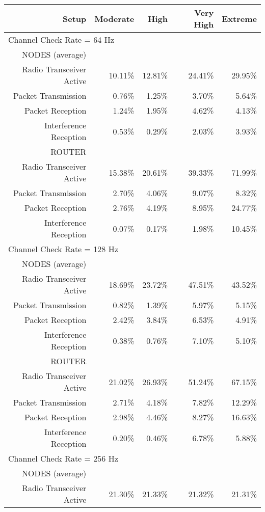 \documentclass[a4paper,twoside]{article}
\begin{document}
\begin{subtables}
\begin{table*}[htbp]
\centering
\begin{tabular}{|r|r|r|r|r|}
\hline
Setup & Moderate & High & Very High & Extreme \\
\hline
\multicolumn{5}{|l|}{Channel Check Rate = 64 Hz}\\
\hline
NODES (average) & & & & \\
Radio Transceiver Active & 10.11\% & 12.81\% & 24.41\% & 29.95\% \\
Packet Transmission & 0.76\% & 1.25\% & 3.70\% & 5.64\% \\
Packet Reception & 1.24\% & 1.95\% & 4.62\% & 4.13\% \\
Interference Reception & 0.53\% & 0.29\% & 2.03\% & 3.93\% \\
ROUTER & & & & \\
Radio Transceiver Active & 15.38\% & 20.61\% & 39.33\% & 71.99\% \\
Packet Transmission & 2.70\% & 4.06\% & 9.07\% & 8.32\% \\
Packet Reception & 2.76\% & 4.19\% & 8.95\% & 24.77\% \\
Interference Reception & 0.07\% & 0.17\% & 1.98\% & 10.45\% \\
\hline
\multicolumn{5}{|l|}{Channel Check Rate = 128 Hz}\\
\hline
NODES (average) & & & & \\
Radio Transceiver Active & 18.69\% & 23.72\% & 47.51\% & 43.52\% \\
Packet Transmission & 0.82\% & 1.39\% & 5.97\% & 5.15\% \\
Packet Reception & 2.42\% & 3.84\% & 6.53\% & 4.91\% \\
Interference Reception & 0.38\% & 0.76\% & 7.10\% & 5.10\% \\
ROUTER & & & & \\
Radio Transceiver Active & 21.02\% & 26.93\% & 51.24\% & 67.15\% \\
Packet Transmission & 2.71\% & 4.18\% & 7.82\% & 12.29\% \\
Packet Reception & 2.98\% & 4.46\% & 8.27\% & 16.63\% \\
Interference Reception & 0.20\% & 0.46\% & 6.78\% & 5.88\% \\
\hline
\multicolumn{5}{|l|}{Channel Check Rate = 256 Hz}\\
\hline
NODES (average) & & & & \\
Radio Transceiver Active & 21.30\% & 21.33\% & 21.32\% & 21.31\% \\

\end{tabular}
\end{table*}
\end{subtables}
\end{document}
